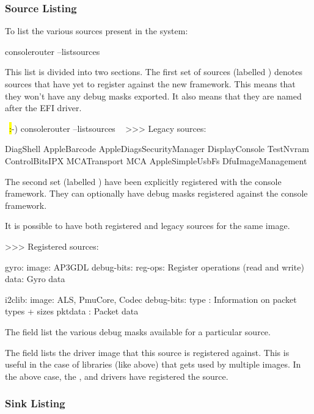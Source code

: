 \subsubsection{Source Listing}

To list the various sources present in the system:

\begin{CommandLine}
consolerouter --listsources
\end{CommandLine}

This list is divided into two sections. The first set of sources (labelled ) denotes sources that have yet to 
register against the new framework. This means that they won't have any debug masks exported. It also means that they are named after the EFI driver.

\begin{LuaCode}
~\hl:-) consolerouter --listsources ~
>>> Legacy sources:

DiagShell
AppleBarcode
AppleDiagsSecurityManager
DisplayConsole
TestNvram
ControlBitsIPX
MCATransport
MCA
AppleSimpleUsbFs
DfuImageManagement
\end{LuaCode}

The second set (labelled ) have been explicitly registered with the console framework. They can optionally have debug masks registered against the console framework. 

It is possible to have both registered and legacy sources for the same image.

\begin{LuaCode}
>>> Registered sources:

gyro:
    image: AP3GDL
    debug-bits:
        reg-ops: Register operations (read and write)
        data: Gyro data

i2clib:
	image: ALS, PmuCore, Codec 
	debug-bits:
		type : Information on packet types + sizes
		pktdata : Packet data
\end{LuaCode}

The  field list the various debug masks available for a particular source. 

The  field lists the driver image that this source is registered against. 
This is useful in the case of libraries (like  above) that gets used by multiple images. 
In the above case, the ,  and  drivers have registered the  source. 

\subsubsection{Sink Listing}

